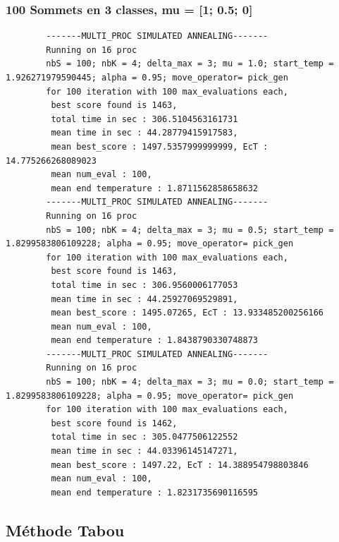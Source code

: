 \documentclass[a4paper]{article}
\begin{document}
		\subsubsection{100 Sommets en 3 classes, mu = [1; 0.5; 0]}
		\begin{verbatim}
		-------MULTI_PROC SIMULATED ANNEALING-------
		Running on 16 proc
		nbS = 100; nbK = 4; delta_max = 3; mu = 1.0; start_temp = 1.926271979590445; alpha = 0.95; move_operator= pick_gen
		for 100 iteration with 100 max_evaluations each, 
		 best score found is 1463,
		 total time in sec : 306.5104563161731
		 mean time in sec : 44.28779415917583,
		 mean best_score : 1497.5357999999999, EcT : 14.775266268089023
		 mean num_eval : 100,
		 mean end temperature : 1.8711562858658632
		-------MULTI_PROC SIMULATED ANNEALING-------
		Running on 16 proc
		nbS = 100; nbK = 4; delta_max = 3; mu = 0.5; start_temp = 1.8299583806109228; alpha = 0.95; move_operator= pick_gen
		for 100 iteration with 100 max_evaluations each, 
		 best score found is 1463,
		 total time in sec : 306.9560006177053
		 mean time in sec : 44.25927069529891,
		 mean best_score : 1495.07265, EcT : 13.933485200256166
		 mean num_eval : 100,
		 mean end temperature : 1.8438790330748873
		-------MULTI_PROC SIMULATED ANNEALING-------
		Running on 16 proc
		nbS = 100; nbK = 4; delta_max = 3; mu = 0.0; start_temp = 1.8299583806109228; alpha = 0.95; move_operator= pick_gen
		for 100 iteration with 100 max_evaluations each, 
		 best score found is 1462,
		 total time in sec : 305.0477506122552
		 mean time in sec : 44.03396145147271,
		 mean best_score : 1497.22, EcT : 14.388954798803846
		 mean num_eval : 100,
		 mean end temperature : 1.8231735690116595
		\end{verbatim}

	\subsection{Méthode Tabou}
\end{document}
